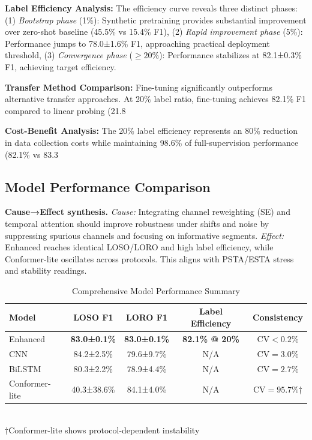 \documentclass[journal]{IEEEtran}
\begin{document}
\textbf{Label Efficiency Analysis:} The efficiency curve reveals three distinct phases: (1) \textit{Bootstrap phase} (1\%): Synthetic pretraining provides substantial improvement over zero-shot baseline (45.5\% vs 15.4\% F1), (2) \textit{Rapid improvement phase} (5\%): Performance jumps to 78.0±1.6\% F1, approaching practical deployment threshold, (3) \textit{Convergence phase} ($\geq 20\%$): Performance stabilizes at 82.1±0.3\% F1, achieving target efficiency.

\textbf{Transfer Method Comparison:} Fine-tuning significantly outperforms alternative transfer approaches. At 20\% label ratio, fine-tuning achieves 82.1\% F1 compared to linear probing (21.8%

\textbf{Cost-Benefit Analysis:} The 20\% label efficiency represents an 80\% reduction in data collection costs while maintaining 98.6\% of full-supervision performance (82.1\% vs 83.3%

\subsection{Model Performance Comparison}

\textbf{Cause→Effect synthesis.} \emph{Cause:} Integrating channel reweighting (SE) and temporal attention should improve robustness under shifts and noise by suppressing spurious channels and focusing on informative segments. \emph{Effect:} Enhanced reaches identical LOSO/LORO and high label efficiency, while Conformer-lite oscillates across protocols. This aligns with PSTA/ESTA stress and stability readings.


\begin{table}[ht]
\centering
\caption{Comprehensive Model Performance Summary}
\begin{tabular}{@{}lcccc@{}}
\toprule
Model & LOSO F1 & LORO F1 & Label Efficiency & Consistency \\
\midrule
Enhanced & \textbf{83.0±0.1\%} & \textbf{83.0±0.1\%} & \textbf{82.1\% @ 20\%} & \textbf{$\text{CV}<0.2\%$} \\
CNN & 84.2±2.5\% & 79.6±9.7\% & N/A & $\text{CV}=3.0\%$ \\
BiLSTM & 80.3±2.2\% & 78.9±4.4\% & N/A & $\text{CV}=2.7\%$ \\
Conformer-lite & 40.3±38.6\% & 84.1±4.0\% & N/A & $\text{CV}=95.7\%$† \\
\bottomrule
\end{tabular}\\
\footnotesize{†Conformer-lite shows protocol-dependent instability}
\label{tab:model_performance}
\end{table}
\end{document}
